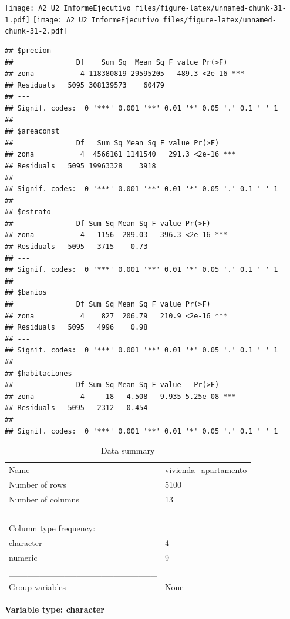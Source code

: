 \documentclass[
]{article}
\begin{document}
\texttt{[image: A2\_U2\_InformeEjecutivo\_files/figure-latex/unnamed-chunk-31-1.pdf]}
\texttt{[image: A2\_U2\_InformeEjecutivo\_files/figure-latex/unnamed-chunk-31-2.pdf]}

\begin{verbatim}
## $preciom
##               Df    Sum Sq  Mean Sq F value Pr(>F)    
## zona           4 118380819 29595205   489.3 <2e-16 ***
## Residuals   5095 308139573    60479                   
## ---
## Signif. codes:  0 '***' 0.001 '**' 0.01 '*' 0.05 '.' 0.1 ' ' 1
## 
## $areaconst
##               Df   Sum Sq Mean Sq F value Pr(>F)    
## zona           4  4566161 1141540   291.3 <2e-16 ***
## Residuals   5095 19963328    3918                   
## ---
## Signif. codes:  0 '***' 0.001 '**' 0.01 '*' 0.05 '.' 0.1 ' ' 1
## 
## $estrato
##               Df Sum Sq Mean Sq F value Pr(>F)    
## zona           4   1156  289.03   396.3 <2e-16 ***
## Residuals   5095   3715    0.73                   
## ---
## Signif. codes:  0 '***' 0.001 '**' 0.01 '*' 0.05 '.' 0.1 ' ' 1
## 
## $banios
##               Df Sum Sq Mean Sq F value Pr(>F)    
## zona           4    827  206.79   210.9 <2e-16 ***
## Residuals   5095   4996    0.98                   
## ---
## Signif. codes:  0 '***' 0.001 '**' 0.01 '*' 0.05 '.' 0.1 ' ' 1
## 
## $habitaciones
##               Df Sum Sq Mean Sq F value   Pr(>F)    
## zona           4     18   4.508   9.935 5.25e-08 ***
## Residuals   5095   2312   0.454                     
## ---
## Signif. codes:  0 '***' 0.001 '**' 0.01 '*' 0.05 '.' 0.1 ' ' 1
\end{verbatim}

\begin{longtable}[]{@{}ll@{}}
\caption{Data summary}\tabularnewline
\toprule\noalign{}
\endfirsthead
\endhead
\bottomrule\noalign{}
\endlastfoot
Name & vivienda\_apartamento \\
Number of rows & 5100 \\
Number of columns & 13 \\
\_\_\_\_\_\_\_\_\_\_\_\_\_\_\_\_\_\_\_\_\_\_\_ & \\
Column type frequency: & \\
character & 4 \\
numeric & 9 \\
\_\_\_\_\_\_\_\_\_\_\_\_\_\_\_\_\_\_\_\_\_\_\_\_ & \\
Group variables & None \\
\end{longtable}

\textbf{Variable type: character}
\end{document}

